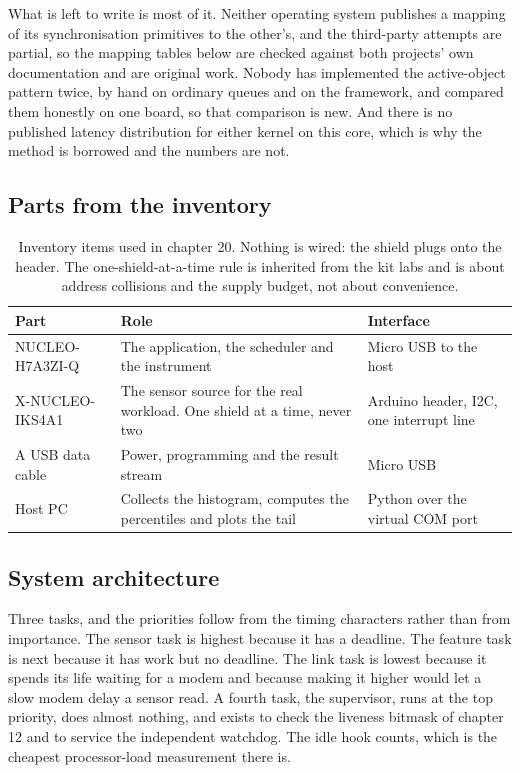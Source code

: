 What is left to write is most of it. Neither operating system publishes a
mapping of its synchronisation primitives to the other's, and the third-party
attempts are partial, so the mapping tables below are checked against both
projects' own documentation and are original work. Nobody has implemented the
active-object pattern twice, by hand on ordinary queues and on the framework,
and compared them honestly on one board, so that comparison is new. And there
is no published latency distribution for either kernel on this core, which is
why the method is borrowed and the numbers are not.

\subsection*{Parts from the inventory}

\begin{table}[H]\centering\small
\begin{tabular}{p{40mm}p{66mm}p{40mm}}
\toprule
Part & Role & Interface \\
\midrule
NUCLEO-H7A3ZI-Q & The application, the scheduler and the instrument & Micro USB to the host \\
X-NUCLEO-IKS4A1 & The sensor source for the real workload. One shield at a time, never two & Arduino header, I2C, one interrupt line \\
A USB data cable & Power, programming and the result stream & Micro USB \\
Host PC & Collects the histogram, computes the percentiles and plots the tail & Python over the virtual COM port \\
\bottomrule
\end{tabular}
\caption{Inventory items used in chapter 20. Nothing is wired: the shield plugs onto the header. The one-shield-at-a-time rule is inherited from the kit labs and is about address collisions and the supply budget, not about convenience.}
\end{table}

\subsection*{System architecture}


Three tasks, and the priorities follow from the timing characters rather than
from importance. The sensor task is highest because it has a deadline. The
feature task is next because it has work but no deadline. The link task is
lowest because it spends its life waiting for a modem and because making it
higher would let a slow modem delay a sensor read. A fourth task, the
supervisor, runs at the top priority, does almost nothing, and exists to check
the liveness bitmask of chapter 12 and to service the independent watchdog. The
idle hook counts, which is the cheapest processor-load measurement there is.

